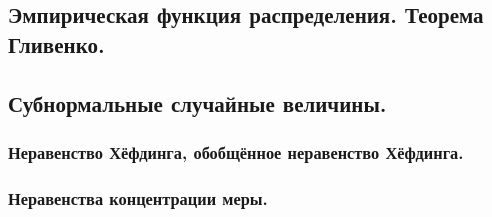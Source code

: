 \subsection{Эмпирическая функция распределения. Теорема Гливенко.}

\subsection{Субнормальные случайные величины.}

\subsubsection{Неравенство Хёфдинга, обобщённое неравенство Хёфдинга.}

\subsubsection{Неравенства концентрации меры.}